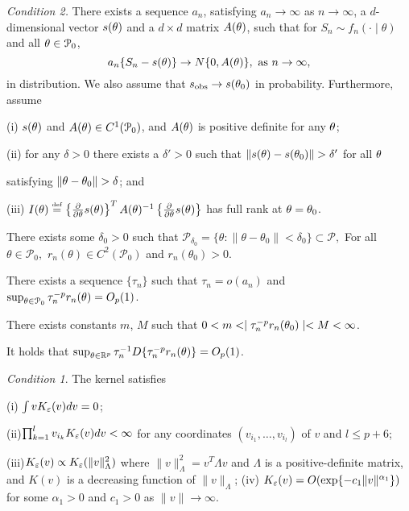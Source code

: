 \documentclass[9pt]{article}
\theoremstyle{remark}
\newtheorem{condition}{Condition}
\begin{document}
{\it Condition 2.} There exists a sequence $a_{n}$, satisfying $a_{n}\rightarrow\infty$
	as $n\rightarrow\infty$, a $d$-dimensional vector $s({}{\theta})$
	and a $d\times d$ matrix $A({}{\theta})$, such that for $S_{n}\sim f_{n}(\cdot\mid\theta)$
	and all ${}{\theta}\in\mathcal{P}_{0}$, 
	\[
	a_{n}\{{}{S}_{n}-s({}{\theta})\}\rightarrow N\{0,A({}{\theta})\},\mbox{ as \ensuremath{n\rightarrow\infty}},
	\]
	in distribution. We also assume that ${}{s}_{\rm obs}\rightarrow s({}{\theta}_{0})$
	in probability. Furthermore, assume
	
	 (i) $s({}{\theta})$
	and $A({}{\theta})\in C^{1}(\mathcal{P}_{0})$, and $A({}{\theta})$ is
	positive definite for any ${}{\theta}$; 
	
	 (ii) for any $\delta>0$ there
	exists a $\delta'>0$ such that $\|s(\btheta)-s(\btheta_{0})\|>\delta'$
	for all ${}{\theta}$ 
	
	satisfying $\|\btheta-\btheta_{0}\|>\delta$; and
	
	 (iii) $I(\theta)\stackrel{\hbox{\tiny def}} = \left\{ \frac{\partial}{\partial\theta}s(\theta)\right\} ^{T}A(\theta)^{-1}\left\{ \frac{\partial}{\partial\theta}s(\theta)\right\} $
	has full rank at ${}{\theta}={}{\theta}_{0}$.


 There exists some $\delta_0 > 0$ such that $\mathcal{P}_{\delta_0} = \{\theta: \| \theta-\theta_0\|  < \delta_0  \} \subset \mathcal{P},$ 
For all $\theta \in \mathcal{P}_{0},$ $r_{n}(\theta) \in C^2(\mathcal{P}_{0})$ and $r_{n}(\theta_0)>0$.

	
 There exists a sequence $\{\tau_{n}\}$ %
such that $\tau_{n}=o(a_n)$ and $\sup_{{}{\theta}\in {\cal P}_{0}}\tau_{n}^{-p}r_{n}({}{\theta})=O_{p}(1)$.


 There exists constants $m$, $M$ such that $0 < m <\mid \tau_{n}^{-p}r_{n}({}{\theta}_{0})\mid < M < \infty$.


 It holds that $\sup_{{}{\theta}\in\mathbb{R}^{p}}\tau_{n}^{-1} D\{\tau_{n}^{-p}r_{n}({}{\theta})\}=O_{p}(1)$.

\begin{condition} \label{kernel_prop}
	The kernel satisfies 
	
	 (i) $\int vK_{\varepsilon}(v)dv=0$; 
	
	 (ii)$\prod_{k=1}^{l}v_{i_{k}}K_{\varepsilon}(v)dv<\infty$
	for any coordinates $(v_{i_{1}},\dots,v_{i_{l}})$ of $v$ and $l\leq p+6$;
	
	 (iii)$K_{\varepsilon}(v)\propto K_{\varepsilon}(\|v\|_{\Lambda}^{2})$ where $\|v\|_{\Lambda}^{2}=v^{T}\Lambda v$
	and $\Lambda$ is a positive-definite matrix, and $K(v)$ is a decreasing
	function of $\|v\|_{\Lambda}$; (iv) $K_{\varepsilon}(v)=O(\exp\{-c_{1}\|v\|^{\alpha_{1}}\})$
	for some $\alpha_{1}>0$ and $c_{1}>0$ as $\|v\|\rightarrow\infty$. 
\end{condition}
\end{document}
